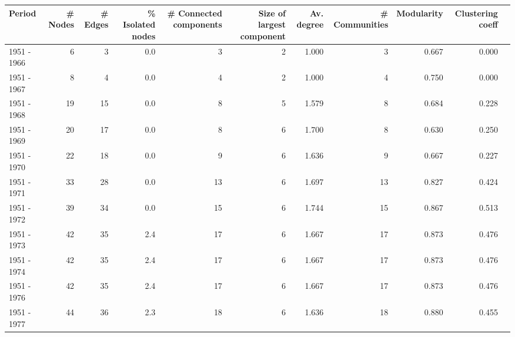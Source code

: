 \begin{tabular}{lrrrrrrrrrr}
\toprule
Period &  \# Nodes &  \# Edges &  \% Isolated nodes &  \multicolumn{1}{p{3cm}}{\centering \# Connected components} &  \multicolumn{1}{p{3cm}}{\centering Size of largest component} &  Av. degree &  \# Communities &  Modularity &  Clustering coeff \\
\midrule
1951 - 1966 &        6 &        3 &    0.0 &                       3 &                          2 &       1.000 &              3 &       0.667 &             0.000 \\
1951 - 1967 &        8 &        4 &    0.0 &                       4 &                          2 &       1.000 &              4 &       0.750 &             0.000 \\
1951 - 1968 &       19 &       15 &    0.0 &                       8 &                          5 &       1.579 &              8 &       0.684 &             0.228 \\
1951 - 1969 &       20 &       17 &    0.0 &                       8 &                          6 &       1.700 &              8 &       0.630 &             0.250 \\
1951 - 1970 &       22 &       18 &    0.0 &                       9 &                          6 &       1.636 &              9 &       0.667 &             0.227 \\
1951 - 1971 &       33 &       28 &    0.0 &                      13 &                          6 &       1.697 &             13 &       0.827 &             0.424 \\
1951 - 1972 &       39 &       34 &    0.0 &                      15 &                          6 &       1.744 &             15 &       0.867 &             0.513 \\
1951 - 1973 &       42 &       35 &    2.4 &                      17 &                          6 &       1.667 &             17 &       0.873 &             0.476 \\
1951 - 1974 &       42 &       35 &    2.4 &                      17 &                          6 &       1.667 &             17 &       0.873 &             0.476 \\
1951 - 1976 &       42 &       35 &    2.4 &                      17 &                          6 &       1.667 &             17 &       0.873 &             0.476 \\
1951 - 1977 &       44 &       36 &    2.3 &                      18 &                          6 &       1.636 &             18 &       0.880 &             0.455 \\

\end{tabular}
